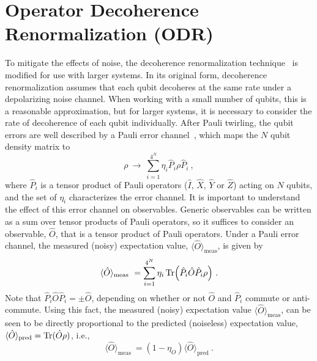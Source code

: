 \documentclass[aps, pra, onecolumn, tightenlines, letterpaper, amsmath, amssymb, preprintnumbers, floatfix, longbibliography, nofootinbib]{revtex4-2}
\begin{document}
\section{Operator Decoherence Renormalization (ODR)}
\label{app:QSimError}
\noindent
To mitigate the effects of noise, the decoherence renormalization technique~\cite{Urbanek_2021,ARahman:2022tkr,Farrell:2022wyt,Ciavarella:2023mfc} 
is modified for use with larger systems. 
In its original form, 
decoherence renormalization assumes that each qubit decoheres at the same rate under a depolarizing noise channel.
When working with a small number of qubits, this is a reasonable approximation, but for larger systems, it is necessary to consider the 
rate of decoherence of each qubit individually.
After Pauli twirling, the qubit errors are well described by a Pauli error channel~\cite{PhysRevA.72.052326}, which maps the $N$ qubit density matrix to
%
\begin{equation}
\rho \ \to  \ \sum_{i=1}^{4^N} \eta_i \hat{P}_i \rho \hat{P}_i \ , 
\end{equation} 
%
where $\hat{P}_i$ is a tensor product of Pauli operators ($\hat{I}$, $\hat{X}$, $\hat{Y}$ or $\hat{Z}$) acting on $N$ qubits, and the set of $\eta_i$ characterizes the error channel. It is important to understand the effect of this error channel on observables. Generic observables can be written as a sum over tensor products of Pauli operators, so it suffices to consider an observable, $\hat{O}$, that is a tensor product of Pauli operators. Under a Pauli error channel, the measured (noisy) expectation value, $\langle \hat{O}\rangle_{\text{meas}}$, is given by
\begin{equation}
\langle \hat{O} \rangle_{\text{meas}} \ =  \sum_{i=1}^{4^N} \eta_i\Tr( \hat{P}_i \hat{O} \hat{P}_i \rho) \ .
\end{equation}
Note that $\hat{P}_i \hat{O} \hat{P}_i = \pm \hat{O}$, depending on whether or not $\hat{O}$ and $\hat{P}_i$ commute or anti-commute. Using this fact, the measured (noisy) expectation value $\langle \hat{O}\rangle_{\text{meas}}$, can be seen to be directly proportional to the predicted (noiseless) expectation value, $\langle \hat{O}\rangle_{\text{pred}} = {\Tr}(\hat{O} \rho)$, i.e.,
\begin{equation}
\langle \hat{O} \rangle_{\text{meas}} \ =  \left ( 1-\eta_O\right ) \langle \hat{O }\rangle_{\text{pred}} \ .
\label{eq:etaO}
\end{equation}
\end{document}
